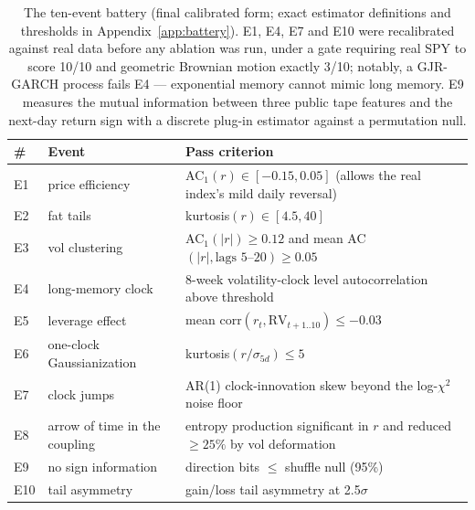 \documentclass[11pt]{article}
\begin{document}
\begin{table}[t]
\centering\small
\begin{tabular}{llp{7.6cm}}
\toprule
\# & Event & Pass criterion \\
\midrule
E1 & price efficiency & AC$_1(r) \in [-0.15, 0.05]$ (allows the real index's mild daily reversal) \\
E2 & fat tails & kurtosis$(r) \in [4.5, 40]$ \\
E3 & vol clustering & AC$_1(|r|) \ge 0.12$ and mean AC$(|r|, \text{lags }5\text{--}20) \ge 0.05$ \\
E4 & long-memory clock & 8-week volatility-clock level autocorrelation above threshold \\
E5 & leverage effect & mean corr$(r_t, \mathrm{RV}_{t+1..10}) \le -0.03$ \\
E6 & one-clock Gaussianization & kurtosis$(r/\sigma_{5d}) \le 5$ \\
E7 & clock jumps & AR(1) clock-innovation skew beyond the log-$\chi^2$ noise floor \\
E8 & arrow of time in the coupling & entropy production significant in $r$ and reduced $\ge 25\%$ by vol deformation \\
E9 & no sign information & direction bits $\le$ shuffle null (95\%) \\
E10 & tail asymmetry & gain/loss tail asymmetry at 2.5$\sigma$ \\
\bottomrule
\end{tabular}
\caption{The ten-event battery (final calibrated form; exact estimator
definitions and thresholds in Appendix~\ref{app:battery}). E1, E4, E7 and E10
were recalibrated against real data before any ablation was run, under a gate
requiring real SPY to score 10/10 and geometric Brownian motion exactly 3/10;
notably, a GJR-GARCH process \citep{glosten1993} fails E4 --- exponential
memory cannot mimic long
memory. E9 measures the mutual information between three public tape features
and the next-day return sign with a discrete plug-in estimator against a
permutation null.}
\label{tab:events}
\end{table}
\end{document}

